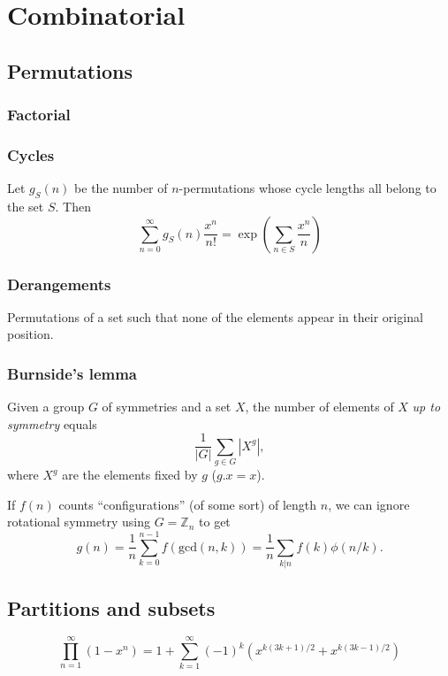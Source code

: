 \chapter{Combinatorial}


\section{Permutations}
	\subsection{Factorial}

	\subsection{Cycles}
		Let $g_S(n)$ be the number of $n$-permutations whose cycle lengths all belong to the set $S$. Then
		$$\sum_{n=0} ^\infty g_S(n) \frac{x^n}{n!} = \exp\left(\sum_{n\in S} \frac{x^n} {n} \right)$$

	\subsection{Derangements}
		Permutations of a set such that none of the elements appear in their original position.
		\scalebox{0.9}{\parbox{\linewidth}{
		\[ \mkern-2mu D(n) = (n-1)(D(n-1)+D(n-2)) = n D(n-1)+(-1)^n = \left\lfloor\frac{n!}{e}\right\rceil \]
		}}

	\subsection{Burnside's lemma}
		Given a group $G$ of symmetries and a set $X$, the number of elements of $X$ \emph{up to symmetry} equals
		 \[ {\frac {1}{|G|}}\sum _{{g\in G}}|X^{g}|, \]
		 where $X^{g}$ are the elements fixed by $g$ ($g.x = x$).

		 If $f(n)$ counts ``configurations'' (of some sort) of length $n$, we can ignore rotational symmetry using $G = \mathbb Z_n$ to get
		 \[ g(n) = \frac 1 n \sum_{k=0}^{n-1}{f(\text{gcd}(n, k))} = \frac 1 n \sum_{k|n}{f(k)\phi(n/k)}. \]

\section{Partitions and subsets}
$$\prod_{n=1}^{\infty}\left(1-x^{n}\right)=1+\sum_{k=1}^\infty(-1)^k\left(x^{k(3k+1)/2}+x^{k(3k-1)/2}\right)$$


